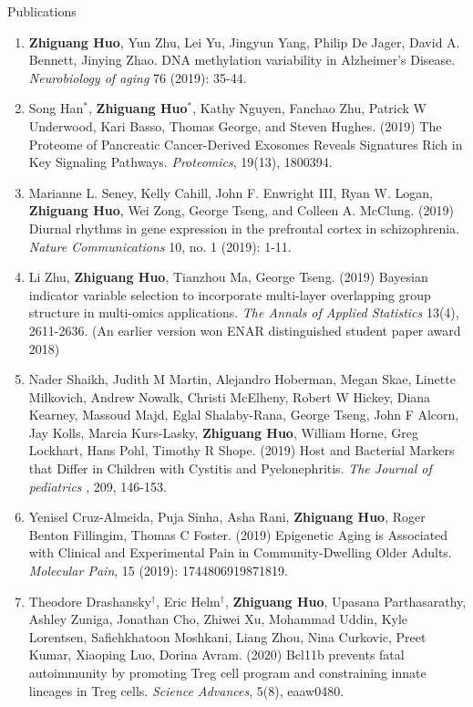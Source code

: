 \documentclass{resume} %
\begin{document}
\begin{rSection}{Publications}
\begin{enumerate}[noitemsep,topsep=0pt,resume]
\item 
{\bf Zhiguang Huo}, Yun Zhu, Lei Yu, Jingyun Yang, Philip De Jager, David A. Bennett, Jinying Zhao.
 DNA methylation variability in Alzheimer's Disease. \emph{Neurobiology of aging} 76 (2019): 35-44.

\item Song Han$^*$, {\bf Zhiguang Huo}$^*$,  Kathy Nguyen,  Fanchao Zhu, Patrick W Underwood, Kari Basso, Thomas George, and Steven Hughes. (2019)
The Proteome of Pancreatic Cancer-Derived Exosomes Reveals Signatures Rich in Key Signaling Pathways. \emph{Proteomics}, 19(13), 1800394.


\item Marianne L. Seney, Kelly Cahill, John F. Enwright III, Ryan W. Logan, {\bf  Zhiguang Huo}, Wei Zong, George Tseng, and Colleen A. McClung. (2019) Diurnal rhythms in gene expression in the prefrontal cortex in schizophrenia. \emph{Nature Communications} 10, no. 1 (2019): 1-11.


\item Li Zhu, {\bf  Zhiguang Huo}, Tianzhou Ma, George Tseng. (2019)
Bayesian indicator variable selection to incorporate multi-layer overlapping group structure in multi-omics applications. 
\emph{The Annals of Applied Statistics} 13(4), 2611-2636. 
(An earlier version won ENAR distinguished student paper award 2018)


\item  
Nader Shaikh, Judith M Martin, Alejandro Hoberman, Megan Skae, Linette Milkovich, Andrew Nowalk, Christi McElheny, Robert W Hickey, Diana Kearney, Massoud Majd, Eglal Shalaby-Rana, George Tseng, John F Alcorn, Jay Kolls, Marcia Kurs-Lasky, {\bf Zhiguang Huo}, William Horne, Greg Lockhart, Hans Pohl, Timothy R Shope. 
(2019)
Host and Bacterial Markers that Differ in Children with Cystitis and Pyelonephritis. \emph{The Journal of pediatrics} , 209, 146-153.

\item Yenisel Cruz-Almeida, Puja Sinha, Asha Rani, {\bf Zhiguang Huo}, Roger Benton Fillingim, Thomas C Foster. (2019)
Epigenetic Aging is Associated with Clinical and Experimental Pain in Community-Dwelling Older Adults.
\emph{Molecular Pain}, 15 (2019): 1744806919871819.

\item 
Theodore Drashansky$^\dagger$, Eric  Helm$^\dagger$, {\bf Zhiguang Huo}, Upasana Parthasarathy,  Ashley Zuniga, Jonathan Cho, Zhiwei Xu,  Mohammad Uddin,  Kyle Lorentsen, Safiehkhatoon Moshkani, Liang Zhou, Nina Curkovic, Preet Kumar,  Xiaoping Luo, Dorina Avram. (2020)
Bcl11b prevents fatal autoimmunity by promoting Treg cell program and constraining innate lineages in Treg cells. 
\emph{Science Advances}, 5(8), eaaw0480.





\end{enumerate}
\end{rSection}
\end{document}
